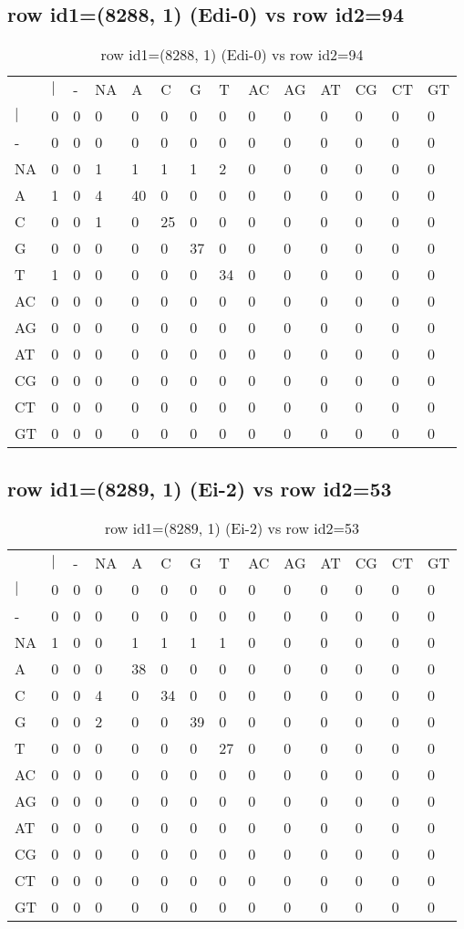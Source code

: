 \subsection{row id1=(8288, 1) (Edi-0) vs row id2=94}
\begin{center}
\begin{longtable}{|l|l|l|l|l|l|l|l|l|l|l|l|l|l|}
\caption{row id1=(8288, 1) (Edi-0) vs row id2=94} \label{table_dm450}\\
\hline
\\
\hline
&$|$&-&NA&A&C&G&T&AC&AG&AT&CG&CT&GT\\
$|$&0&0&0&0&0&0&0&0&0&0&0&0&0\\
-&0&0&0&0&0&0&0&0&0&0&0&0&0\\
NA&0&0&1&1&1&1&2&0&0&0&0&0&0\\
A&1&0&4&40&0&0&0&0&0&0&0&0&0\\
C&0&0&1&0&25&0&0&0&0&0&0&0&0\\
G&0&0&0&0&0&37&0&0&0&0&0&0&0\\
T&1&0&0&0&0&0&34&0&0&0&0&0&0\\
AC&0&0&0&0&0&0&0&0&0&0&0&0&0\\
AG&0&0&0&0&0&0&0&0&0&0&0&0&0\\
AT&0&0&0&0&0&0&0&0&0&0&0&0&0\\
CG&0&0&0&0&0&0&0&0&0&0&0&0&0\\
CT&0&0&0&0&0&0&0&0&0&0&0&0&0\\
GT&0&0&0&0&0&0&0&0&0&0&0&0&0\\
\hline
\end{longtable}
\end{center}

\subsection{row id1=(8289, 1) (Ei-2) vs row id2=53}
\begin{center}
\begin{longtable}{|l|l|l|l|l|l|l|l|l|l|l|l|l|l|}
\caption{row id1=(8289, 1) (Ei-2) vs row id2=53} \label{table_dm452}\\
\hline
\\
\hline
&$|$&-&NA&A&C&G&T&AC&AG&AT&CG&CT&GT\\
$|$&0&0&0&0&0&0&0&0&0&0&0&0&0\\
-&0&0&0&0&0&0&0&0&0&0&0&0&0\\
NA&1&0&0&1&1&1&1&0&0&0&0&0&0\\
A&0&0&0&38&0&0&0&0&0&0&0&0&0\\
C&0&0&4&0&34&0&0&0&0&0&0&0&0\\
G&0&0&2&0&0&39&0&0&0&0&0&0&0\\
T&0&0&0&0&0&0&27&0&0&0&0&0&0\\
AC&0&0&0&0&0&0&0&0&0&0&0&0&0\\
AG&0&0&0&0&0&0&0&0&0&0&0&0&0\\
AT&0&0&0&0&0&0&0&0&0&0&0&0&0\\
CG&0&0&0&0&0&0&0&0&0&0&0&0&0\\
CT&0&0&0&0&0&0&0&0&0&0&0&0&0\\
GT&0&0&0&0&0&0&0&0&0&0&0&0&0\\
\hline
\end{longtable}
\end{center}

